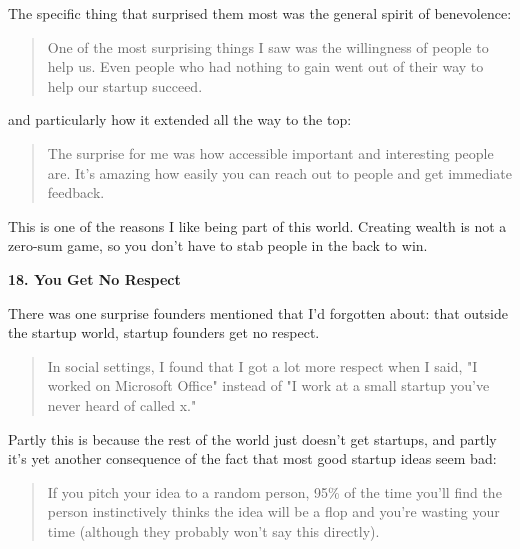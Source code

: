                  The specific thing that surprised them most was the general
                  spirit of benevolence:
                  \begin{quote}

                    One of the most surprising things I saw was the willingness
                    of people to help us. Even people who had nothing to gain
                    went out of their way to help our startup succeed.
                  
\end{quote}

                  and particularly how it extended all the way to the top:
                  \begin{quote}

                    The surprise for me was how accessible important and
                    interesting people are. It's amazing how easily you can
                    reach out to people and get immediate feedback.
                  
\end{quote}

                  This is one of the reasons I like being part of this world.
                  Creating wealth is not a zero-sum game, so you don't have to
                  stab people in the back to win.


                  \textbf{18. You Get No Respect}

There was one
                  surprise founders mentioned that I'd forgotten about: that
                  outside the startup world, startup founders get no respect.
                  \begin{quote}

                    In social settings, I found that I got a lot more respect
                    when I said, "I worked on Microsoft Office" instead of "I
                    work at a small startup you've never heard of called x."
                  
\end{quote}

                  Partly this is because the rest of the world just doesn't get
                  startups, and partly it's yet another consequence of the fact
                  that most good startup ideas seem bad:
                  \begin{quote}

                    If you pitch your idea to a random person, 95\% of the time
                    you'll find the person instinctively thinks the idea will be
                    a flop and you're wasting your time (although they probably
                    won't say this directly).
                  
\end{quote}

